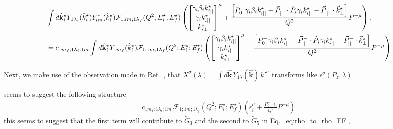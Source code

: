 \begin{align}
&
\int d\hat{\bf k}^\star_i
{Y_{1\lambda_i}(\hat{k}_i^\star)}
Y^*_{lm}(\hat{k}_i^\star)
 \mathcal{F}_{1;l m;1\lambda_f}(Q^2;E_i^\star;E_f^\star)
\left(
\begin{bmatrix} 
\gamma_i\beta_ik_{i||}^\star\\
\gamma_i k_{i||}^\star\\
 k^\star_{i\perp}
 \end{bmatrix}^\mu
+
\frac{\left[P^-_0\gamma_i \beta_ik_{i||}^\star-\vec{P}^-_{||}\cdot\hat{P}_i \gamma_i k_{i||}^\star - \vec{P}^-_{||}\cdot\vec{k}^\star_\perp\right]}{Q^2} P^{-\mu}\right).
\nonumber\\
&=
c_{1m_f;1\lambda_i;1m}
\int d\hat{\bf k}^\star_i
Y_{1m_f}(\hat{k}_i^\star)
 \mathcal{F}_{1;1 m;1\lambda_f}(Q^2;E_i^\star;E_f^\star)
\left(
\begin{bmatrix} 
\gamma_i\beta_ik_{i||}^\star\\
\gamma_i k_{i||}^\star\\
 k^\star_{i\perp}
 \end{bmatrix}^\mu
+
\frac{\left[P^-_0\gamma_i \beta_ik_{i||}^\star-\vec{P}^-_{||}\cdot\hat{P}_i \gamma_i k_{i||}^\star - \vec{P}^-_{||}\cdot\vec{k}^\star_\perp\right]}{Q^2} P^{-\mu}\right)
\end{align}

Next, we make use of the observation made in Ref.~\cite{Briceno:2016kkp}, that $X^\sigma(\lambda) = \int \! d\hat{\mathbf{k}} \, Y_{1\lambda}(\hat{\mathbf{k}})\, k'^\sigma$ transforms like $\epsilon^{\sigma}(P_z, \lambda)$.


seems to suggest the following structure
\begin{align}
c_{1m_f;1\lambda_i;1m}\,
 \mathcal{F}_{1;1 m;1\lambda_f}(Q^2;E_i^\star;E_f^\star)
\left(
\epsilon_i^\mu+
\frac{P^-_0\cdot \epsilon_i}{Q^2} P^{-\mu}\right)
\end{align}
this seems to suggest that the first term will contribute to $\widetilde{G}_3$ and the second to $\widetilde{G}_5$ in Eq.~\ref{eq:rho_to_rho_FF},
{}


